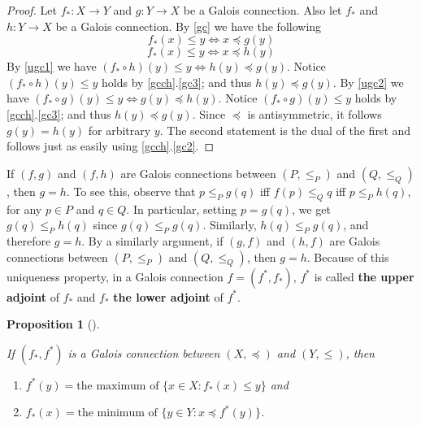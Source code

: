 \documentclass[
  twoside,
  12pt,
  letterpaper,
  fleqn]{article}
\providecommand{\tightlist}{%
  \setlength{\itemsep}{0pt}\setlength{\parskip}{0pt}}\usepackage{longtable,booktabs,array}
\theoremstyle{definition}
\theoremstyle{definition}
\theoremstyle{plain}
\newtheorem{proposition}{Proposition}[section]
\theoremstyle{remark}
\begin{document}
\begin{proof}

Let \(f_*:X \to Y\) and \(g:Y\to X\) be a Galois connection. Also let
\(f_*\) and \(h:Y\to X\) be a Galois connection. By \eqref{gc} we have
the following\\
\begin{equation}
\label{ugc1}
f_*(x)\leqslant y \Longleftrightarrow x\preceq g(y)
\end{equation} \begin{equation}
\label{ugc2}
f_*(x)\leqslant y \Longleftrightarrow x\preceq h(y)
\end{equation} By \eqref{ugc1} we have
\((f_*\circ h)(y)\leqslant y\Longleftrightarrow h(y)\preceq g(y)\).
Notice \((f_*\circ h)(y)\leqslant y\) holds by \eqref{gcch}.\eqref{gc3};
and thus \(h(y)\preceq g(y)\). By \eqref{ugc2} we have
\((f_*\circ g)(y)\leqslant y \Longleftrightarrow g(y)\preceq h(y)\).
Notice \((f_*\circ g)(y)\leqslant y\) holds by \eqref{gcch}.\eqref{gc3};
and thus \(h(y)\preceq g(y)\). Since \(\preceq\) is antisymmetric, it
follows \(g(y)=h(y)\) for arbitrary \(y\). The second statement is the
dual of the first and follows just as easily using
\eqref{gcch}.\eqref{gc2}.

\end{proof}

If \((f,g)\) and \((f,h)\) are Galois connections between \((P,\le_P)\)
and \((Q,\le_Q)\), then \(g=h\). To see this, observe that
\(p\le_P g(q)\) iff \(f(p)\le_Q q\) iff \(p \le_P h(q)\), for any
\(p\in P\) and \(q\in Q\). In particular, setting \(p=g(q)\), we get
\(g(q)\le_P h(q)\) since \(g(q)\le_P g(q)\). Similarly,
\(h(q)\le_P g(q)\), and therefore \(g=h\). By a similarly argument, if
\((g,f)\) and \((h,f)\) are Galois connections between \((P,\le_P)\) and
\((Q,\le_Q)\), then \(g=h\). Because of this uniqueness property, in a
Galois connection \(f=(f^*,f_*)\), \(f^*\) is called \textbf{the upper
adjoint} of \(f_*\) and \(f_*\) \textbf{the lower adjoint} of \(f^*\).

\begin{proposition}[]\protect\hypertarget{prp-maximum-minimum}{}\label{prp-maximum-minimum}

If \((f_*, f^*)\) is a Galois connection between \((X,\preceq)\) and
\((Y,\leqslant)\), then

\begin{enumerate}
\def\labelenumi{\arabic{enumi}.}
\tightlist
\item
  \(f^*(y)=\textrm{the maximum of } \{x\in X : f_*(x)\leqslant y\}\) and
\item
  \(f_*(x)=\textrm{the minimum of } \{y\in Y : x\preceq f^*(y)\}\).
\end{enumerate}

\end{proposition}
\end{document}
